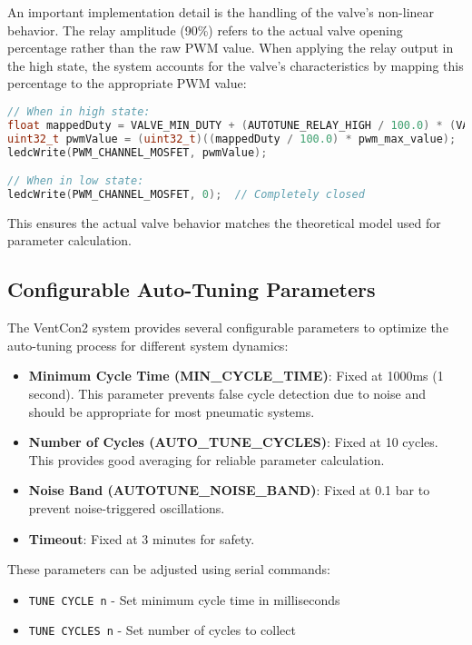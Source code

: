 \documentclass[a4paper,11pt]{article}
\begin{document}
An important implementation detail is the handling of the valve's non-linear behavior. The relay amplitude (90\%) refers to the actual valve opening percentage rather than the raw PWM value. When applying the relay output in the high state, the system accounts for the valve's characteristics by mapping this percentage to the appropriate PWM value:

\begin{lstlisting}[language=C++, caption=Auto-Tuning Relay Output]
// When in high state:
float mappedDuty = VALVE_MIN_DUTY + (AUTOTUNE_RELAY_HIGH / 100.0) * (VALVE_MAX_DUTY - VALVE_MIN_DUTY);
uint32_t pwmValue = (uint32_t)((mappedDuty / 100.0) * pwm_max_value);
ledcWrite(PWM_CHANNEL_MOSFET, pwmValue);

// When in low state:
ledcWrite(PWM_CHANNEL_MOSFET, 0);  // Completely closed
\end{lstlisting}

This ensures the actual valve behavior matches the theoretical model used for parameter calculation.

\subsection{Configurable Auto-Tuning Parameters}

The VentCon2 system provides several configurable parameters to optimize the auto-tuning process for different system dynamics:

\begin{itemize}
    \item \textbf{Minimum Cycle Time (MIN\_CYCLE\_TIME)}: Fixed at 1000ms (1 second). This parameter prevents false cycle detection due to noise and should be appropriate for most pneumatic systems.
    \item \textbf{Number of Cycles (AUTO\_TUNE\_CYCLES)}: Fixed at 10 cycles. This provides good averaging for reliable parameter calculation.
    \item \textbf{Noise Band (AUTOTUNE\_NOISE\_BAND)}: Fixed at 0.1 bar to prevent noise-triggered oscillations.
    \item \textbf{Timeout}: Fixed at 3 minutes for safety.
\end{itemize}

These parameters can be adjusted using serial commands:
\begin{itemize}
    \item \texttt{TUNE CYCLE n} - Set minimum cycle time in milliseconds
    \item \texttt{TUNE CYCLES n} - Set number of cycles to collect
\end{itemize}
\end{document}
